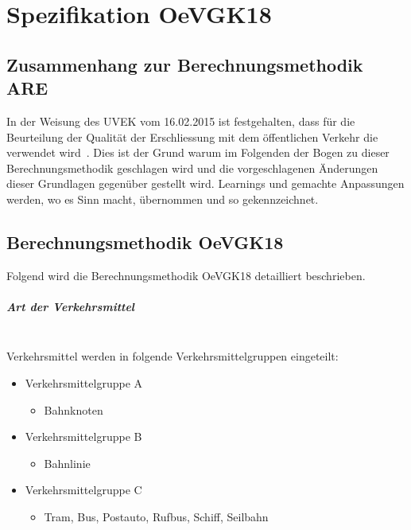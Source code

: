 
\section{Spezifikation OeVGK18}
\label{Spezifikation OeVGK18}

\subsection{Zusammenhang zur Berechnungsmethodik ARE}
\label{Spezifikation OeVGK18:Zusammenhang zur Berechnungsmethodik ARE}
In der Weisung des \acs{UVEK} vom 16.02.2015 ist festgehalten, dass für die Beurteilung der Qualität der Erschliessung mit dem öffentlichen Verkehr die  verwendet wird~\cite{weisung_uvek}.
Dies ist der Grund warum im Folgenden der Bogen zu dieser Berechnungsmethodik geschlagen wird und die vorgeschlagenen Änderungen dieser Grundlagen gegenüber gestellt wird.
Learnings und gemachte Anpassungen werden, wo es Sinn macht, übernommen und so gekennzeichnet. 

\subsection{Berechnungsmethodik OeVGK18}
\label{Berechnungsmethodik OeVGK18}
Folgend wird die Berechnungsmethodik \gls{OeVGK18} detailliert beschrieben.

\subparagraph{Art der Verkehrsmittel}~\\
\label{Berechnungsmethodik OeVGK18:Art der Verkehrsmittel}
Verkehrsmittel werden in folgende Verkehrsmittelgruppen eingeteilt:

\begin{itemize}[noitemsep]
    \item Verkehrsmittelgruppe A
    \begin{itemize}
        \item Bahnknoten
    \end{itemize}
    \item Verkehrsmittelgruppe B
    \begin{itemize}
        \item Bahnlinie
    \end{itemize}
    \item Verkehrsmittelgruppe C
    \begin{itemize}
        \item Tram, Bus, Postauto, Rufbus, Schiff, Seilbahn
    \end{itemize}
\end{itemize}

